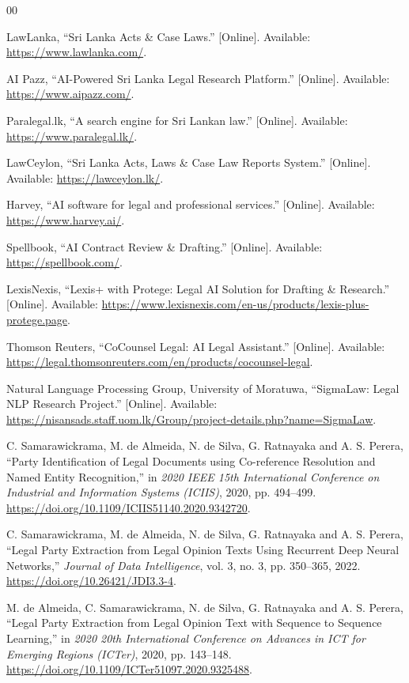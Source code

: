 \documentclass[11pt,a4paper]{article}
\begin{document}
\begin{thebibliography}{00}

LawLanka, ``Sri Lanka Acts \& Case Laws.'' [Online]. Available:
\url{https://www.lawlanka.com/}.

AI Pazz, ``AI-Powered Sri Lanka Legal Research Platform.'' [Online]. Available:
\url{https://www.aipazz.com/}.

Paralegal.lk, ``A search engine for Sri Lankan law.'' [Online]. Available:
\url{https://www.paralegal.lk/}.

LawCeylon, ``Sri Lanka Acts, Laws \& Case Law Reports System.'' [Online].
Available: \url{https://lawceylon.lk/}.

Harvey, ``AI software for legal and professional services.'' [Online]. Available:
\url{https://www.harvey.ai/}.

Spellbook, ``AI Contract Review \& Drafting.'' [Online]. Available:
\url{https://spellbook.com/}.

LexisNexis, ``Lexis+ with Protege: Legal AI Solution for Drafting \& Research.''
[Online]. Available:
\url{https://www.lexisnexis.com/en-us/products/lexis-plus-protege.page}.

Thomson Reuters, ``CoCounsel Legal: AI Legal Assistant.'' [Online]. Available:
\url{https://legal.thomsonreuters.com/en/products/cocounsel-legal}.

Natural Language Processing Group, University of Moratuwa, ``SigmaLaw: Legal NLP
Research Project.'' [Online]. Available:
\url{https://nisansads.staff.uom.lk/Group/project-details.php?name=SigmaLaw}.

C. Samarawickrama, M. de Almeida, N. de Silva, G. Ratnayaka and A. S. Perera,
``Party Identification of Legal Documents using Co-reference Resolution and Named Entity
Recognition,'' in \emph{2020 IEEE 15th International Conference on Industrial and
Information Systems (ICIIS)}, 2020, pp. 494--499.
\url{https://doi.org/10.1109/ICIIS51140.2020.9342720}.

C. Samarawickrama, M. de Almeida, N. de Silva, G. Ratnayaka and A. S. Perera,
``Legal Party Extraction from Legal Opinion Texts Using Recurrent Deep Neural Networks,''
\emph{Journal of Data Intelligence}, vol. 3, no. 3, pp. 350--365, 2022.
\url{https://doi.org/10.26421/JDI3.3-4}.

M. de Almeida, C. Samarawickrama, N. de Silva, G. Ratnayaka and A. S. Perera,
``Legal Party Extraction from Legal Opinion Text with Sequence to Sequence Learning,''
in \emph{2020 20th International Conference on Advances in ICT for Emerging Regions
(ICTer)}, 2020, pp. 143--148. \url{https://doi.org/10.1109/ICTer51097.2020.9325488}.


\end{thebibliography}
\end{document}
